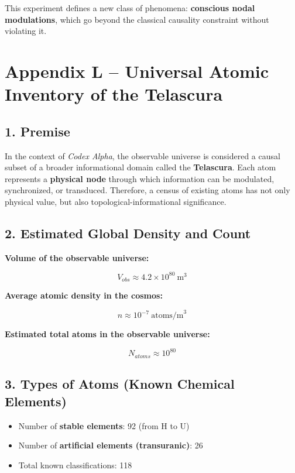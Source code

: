 \documentclass[12pt]{article}
\begin{document}
This experiment defines a new class of phenomena: \textbf{conscious nodal modulations}, which go beyond the classical causality constraint without violating it.

\section*{Appendix L – Universal Atomic Inventory of the Telascura}

\subsection*{1. Premise}

In the context of \textit{Codex Alpha}, the observable universe is considered a causal subset of a broader informational domain called the \textbf{Telascura}. Each atom represents a \textbf{physical node} through which information can be modulated, synchronized, or transduced. Therefore, a census of existing atoms has not only physical value, but also topological-informational significance.

\subsection*{2. Estimated Global Density and Count}

\textbf{Volume of the observable universe:}

\[
V_{obs} \approx 4.2 \times 10^{80}\ \text{m}^3
\]

\textbf{Average atomic density in the cosmos:}

\[
n \approx 10^{-7}\ \text{atoms/m}^3
\]

\textbf{Estimated total atoms in the observable universe:}

\[
N_{atoms} \approx 10^{80}
\]

\subsection*{3. Types of Atoms (Known Chemical Elements)}

\begin{itemize}
    \item Number of \textbf{stable elements}: 92 (from H to U)
    \item Number of \textbf{artificial elements (transuranic)}: 26
    \item Total known classifications: 118
\end{itemize}
\end{document}
